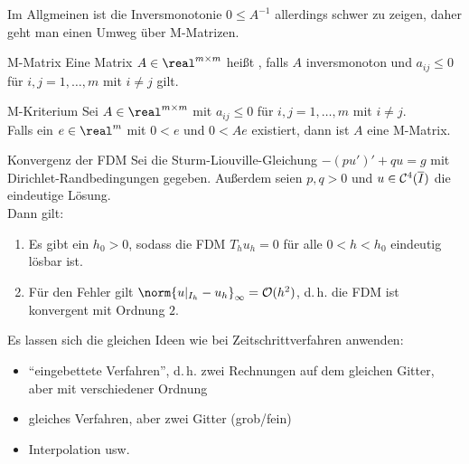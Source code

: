 \begin{Bem}
    Im Allgmeinen ist die Inversmonotonie $0 \le A^{-1}$ allerdings
    schwer zu zeigen, daher geht man einen Umweg über M-Matrizen.
\end{Bem}

\begin{Def}{M-Matrix}
    Eine Matrix $A \in \real^{m \times m}$ heißt , falls
    $A$ inversmonoton und $a_{ij} \le 0$ für
    $i, j = 1, \dotsc, m$ mit $i \not= j$ gilt.
\end{Def}

\begin{Satz}{M-Kriterium}
    Sei $A \in \real^{m \times m}$ mit $a_{ij} \le 0$ für
    $i, j = 1, \dotsc, m$ mit $i \not= j$.\\
    Falls ein $e \in \real^m$ mit $0 < e$ und $0 < Ae$ existiert, dann ist
    $A$ eine M-Matrix.
\end{Satz}

\linie

\begin{Satz}{Konvergenz der FDM}
    Sei die Sturm-Liouville-Gleichung $-(pu')' + qu = g$ mit
    Dirichlet-Randbedingungen gegeben.
    Außerdem seien $p, q > 0$ und $u \in \mathcal{C}^4(\overline{I})$ die eindeutige
    Lösung.\\
    Dann gilt:
    \begin{enumerate}[label=(\emph{\roman*})]
        \item
        Es gibt ein $h_0 > 0$, sodass die FDM $T_h u_h = 0$ für alle
        $0 < h < h_0$ eindeutig lösbar ist.
        
        \item
        Für den Fehler gilt $\norm{u|_{I_h} - u_h}_\infty = \O(h^2)$,
        d.\,h. die FDM ist konvergent mit Ordnung $2$.
    \end{enumerate}
\end{Satz}

\linie

\begin{Bem}
    Es lassen sich die gleichen Ideen wie bei Zeitschrittverfahren anwenden:
    \begin{itemize}
        \item
        "`eingebettete Verfahren"', d.\,h. zwei Rechnungen auf dem gleichen
        Gitter, aber mit verschiedener Ordnung
        
        \item
        gleiches Verfahren, aber zwei Gitter (grob/fein)
        
        \item
        Interpolation usw.
    \end{itemize}
\end{Bem}

